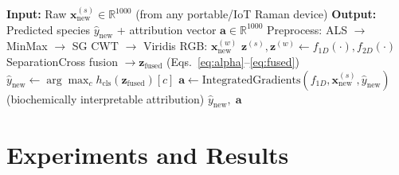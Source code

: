 \documentclass[preprint,12pt]{elsarticle}
\begin{document}
\begin{algorithm}[!t]
\caption{Inference on a new Raman spectrum (2.3~ms end-to-end)}
\label{alg:inference}
\begin{algorithmic}[1]
  \State \textbf{Input:} Raw
         $\mathbf{x}_\mathrm{new}^{(s)}\in\mathbb{R}^{1000}$
         (from any portable/IoT Raman device)
  \State \textbf{Output:} Predicted species $\hat{y}_\mathrm{new}$ +
         attribution vector $\mathbf{a}\in\mathbb{R}^{1000}$
  \State Preprocess: ALS $\to$ MinMax $\to$ SG
  \State CWT $\to$ Viridis RGB: $\mathbf{x}_\mathrm{new}^{(w)}$
  \State $\mathbf{z}^{(s)},\mathbf{z}^{(w)}\leftarrow
         f_{1D}(\cdot),f_{2D}(\cdot)$
  \State SeparationCross fusion $\to\mathbf{z}_\mathrm{fused}$
         \hfill{\small(Eqs.~\ref{eq:alpha}--\ref{eq:fused})}
  \State $\hat{y}_\mathrm{new}\leftarrow
         \arg\max_c h_\mathrm{cls}(\mathbf{z}_\mathrm{fused})[c]$
  \State $\mathbf{a}\leftarrow
         \mathrm{IntegratedGradients}(f_{1D},
         \mathbf{x}_\mathrm{new}^{(s)},\hat{y}_\mathrm{new})$
         \hfill{\small(biochemically interpretable attribution)}
  \State \Return $\hat{y}_\mathrm{new},\;\mathbf{a}$
\end{algorithmic}
\end{algorithm}


\section{Experiments and Results}
\label{sec:experiments}
\end{document}

